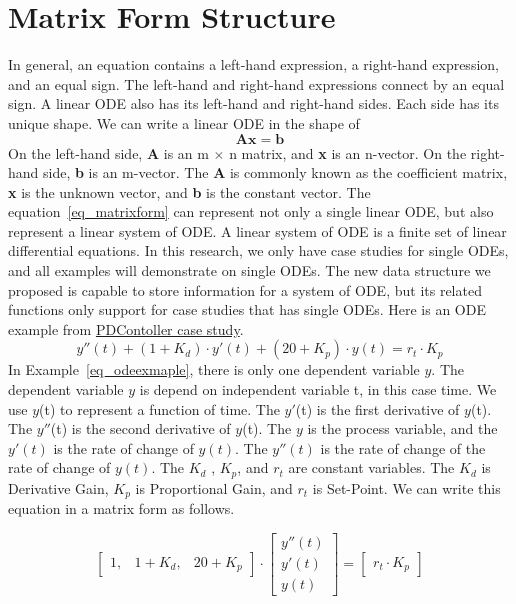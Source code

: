 \section{Matrix Form Structure}
In general, an equation contains a left-hand expression, a right-hand expression, and an equal sign. The left-hand and right-hand expressions connect by an equal sign. A linear ODE also has its left-hand and right-hand sides. Each side has its unique shape. We can write a linear ODE in the shape of
\begin{equation} \label{eq_matrixform}
	\boldsymbol{Ax} = \boldsymbol{b}
\end{equation}
On the left-hand side, \textbf{A} is an m $\times$ n matrix, and \textbf{x} is an n-vector. On the right-hand side, \textbf{b} is an m-vector. The \textbf{A} is commonly known as the coefficient matrix, \textbf{x} is the unknown vector, and \textbf{b} is the constant vector. The equation~\ref{eq_matrixform} can represent not only a single linear ODE, but also represent a linear system of ODE. A linear system of ODE is a finite set of linear differential equations. In this research, we only have case studies for single ODEs, and all examples will demonstrate on single ODEs. The new data structure we proposed is capable to store information for a system of ODE, but its related functions only support for case studies that has single ODEs. Here is an ODE example from \href{https://jacquescarette.github.io/Drasil/examples/pdcontroller/SRS/srs/PDController_SRS.html#Sec:IMs}{PDContoller case study}.
\begin{equation} \label{eq_odeexmaple}
	y''(t) + (1 + K_d) \cdot y'(t) + (20 + K_p) \cdot y(t) = r_t \cdot K_p
\end{equation}
In Example~\ref{eq_odeexmaple}, there is only one dependent variable $y$. The dependent variable $y$ is depend on independent variable t, in this case time. We use $y$(t) to represent a function of time. The $y'$(t) is the first derivative of $y$(t). The $y''$(t) is the second derivative of $y$(t). The $y$ is the process variable, and the $y'(t)$ is the rate of change of $y(t)$. The $y''(t)$ is the rate of change of the rate of change of $y(t)$. The $K_d$ , $K_p$, and $r_t$ are constant variables. The $K_d$ is Derivative Gain, $K_p$ is Proportional Gain, and $r_t$ is Set-Point. We can write this equation in a matrix form as follows.

\begin{equation} \label{eq_matrixformexmaple}
	\begin{bmatrix}
		1, & 1 + K_{d}, & 20 + K_{p}
	\end{bmatrix}
	\cdot
	\begin{bmatrix}
		y''(t)  \\
		y'(t)   \\
		y(t)  
	\end{bmatrix}
	=
	\begin{bmatrix}
		r_{t} \cdot K_{p} 
	\end{bmatrix}
\end{equation}

